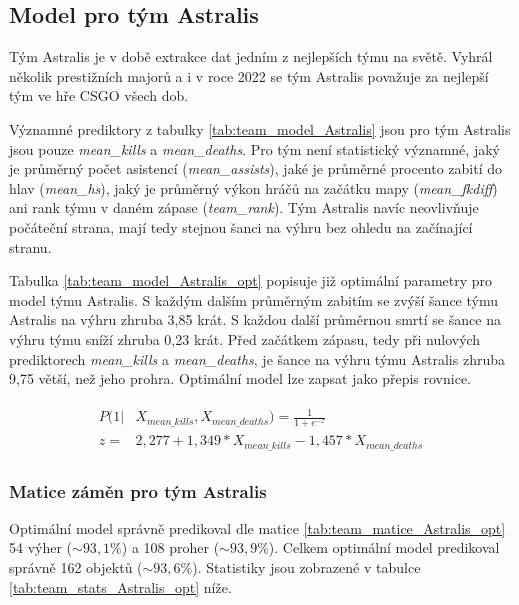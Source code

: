 \subsection{Model pro tým Astralis}
Tým Astralis je v době extrakce dat jedním z nejlepších týmu na světě. Vyhrál několik prestižních majorů a i v roce 2022 se tým Astralis považuje za nejlepší tým
ve hře \ac{CSGO} všech dob.



Významné prediktory z tabulky \ref{tab:team_model_Astralis} jsou pro tým Astralis jsou pouze \textit{mean\_kills} a \textit{mean\_deaths}.  Pro tým
není statistický významné, jaký je průměrný počet asistencí (\textit{mean\_assists}), jaké je průměrné procento zabití do hlav (\textit{mean\_hs}), jaký je
průměrný výkon hráčů na začátku mapy (\textit{mean\_fkdiff}) ani rank týmu v daném zápase (\textit{team\_rank}). Tým Astralis navíc neovlivňuje počáteční strana,
mají tedy stejnou šanci na výhru bez ohledu na začínající stranu.



Tabulka \ref{tab:team_model_Astralis_opt} popisuje již optimální parametry pro model týmu Astralis. S každým dalším průměrným zabitím se zvýší šance
týmu Astralis na výhru zhruba 3,85 krát. S každou další průměrnou smrtí se šance na výhru týmu sníží zhruba 0,23 krát. 
Před začátkem zápasu, tedy při nulových prediktorech \textit{mean\_kills} a \textit{mean\_deaths}, je šance na výhru týmu Astralis zhruba 9,75 větší, než jeho
prohra. Optimální model lze zapsat jako přepis rovnice.

\begin{align*}
    \begin{split}
        P(1 | &X_{mean\_kills},  X_{mean\_deaths}) = \frac{1}{1 + e^{-z}} \\
        z = &2,277 + 1,349*X_{mean\_kills} - 1,457*X_{mean\_deaths}
    \end{split}
\end{align*}

\subsubsection{Matice záměn pro tým Astralis}



Optimální model správně predikoval dle matice \ref{tab:team_matice_Astralis_opt} 54 výher ($\sim 93,1 \%$) a 108 proher ($\sim 93,9 \%$). Celkem optimální
model predikoval správně 162 objektů ($\sim 93,6 \%$). Statistiky jsou zobrazené v tabulce \ref{tab:team_stats_Astralis_opt} níže.


